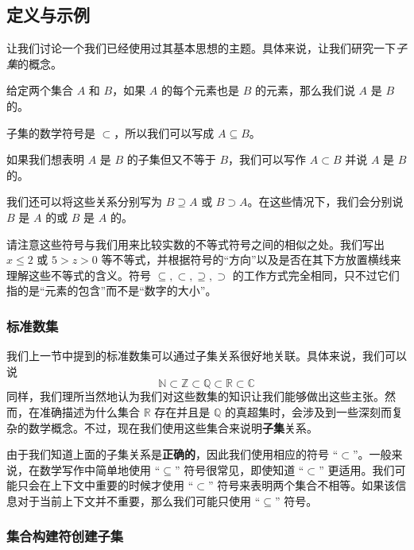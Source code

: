 \subsection{定义与示例}

让我们讨论一个我们已经使用过其基本思想的主题。具体来说，让我们研究一下\emph{子集}的概念。

\begin{definition}
    给定两个集合 $A$ 和 $B$，如果 $A$ 的每个元素也是 $B$ 的元素，那么我们说 $A$ 是 $B$ 的。

    子集的数学符号是 $\subset$，所以我们可以写成 $A \subseteq B$。

    如果我们想表明 $A$ 是 $B$ 的子集但又不等于 $B$，我们可以写作 $A \subset B$ 并说 $A$ 是 $B$ 的。

    我们还可以将这些关系分别写为 $B \supseteq A$ 或 $B \supset A$。在这些情况下，我们会分别说 $B$ 是 $A$ 的或 $B$ 是 $A$ 的。
\end{definition}

请注意这些符号与我们用来比较实数的不等式符号之间的相似之处。我们写出 $x \le 2$ 或 $5 > z > 0$ 等不等式，并根据符号的``方向''以及是否在其下方放置横线来理解这些不等式的含义。符号 $\subseteq, \subset,\supseteq, \supset$ 的工作方式完全相同，只不过它们指的是``元素的包含''而不是``数字的大小''。

\subsubsection*{标准数集}

我们上一节中提到的标准数集可以通过子集关系很好地关联。具体来说，我们可以说
\[\mathbb{N} \subset \mathbb{Z} \subset \mathbb{Q} \subset \mathbb{R} \subset \mathbb{C}\]
同样，我们理所当然地认为我们对这些数集的知识让我们能够做出这些主张。然而，在准确描述为什么集合 $\mathbb{R}$ 存在并且是 $\mathbb{Q}$ 的真超集时，会涉及到一些深刻而复杂的数学概念。不过，现在我们使用这些集合来说明\textbf{子集}关系。

由于我们知道上面的子集关系是\textbf{正确的}，因此我们使用相应的符号 ``$\subset$''。一般来说，在数学写作中简单地使用 ``$\subseteq$'' 符号很常见，即使知道 ``$\subset$'' 更适用。我们可能只会在上下文中重要的时候才使用 ``$\subset$'' 符号来表明两个集合不相等。如果该信息对于当前上下文并不重要，那么我们可能只使用 ``$\subseteq$'' 符号。

\subsubsection*{集合构建符创建子集}

